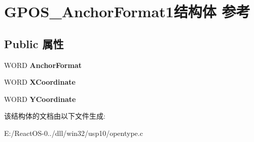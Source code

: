 \hypertarget{struct_g_p_o_s___anchor_format1}{}\section{G\+P\+O\+S\+\_\+\+Anchor\+Format1结构体 参考}
\label{struct_g_p_o_s___anchor_format1}
\subsection*{Public 属性}
\begin{DoxyCompactItemize}
\item 
\mbox{\label{struct_g_p_o_s___anchor_format1_ac1976368383d36f6607170c04d0459bd}} 
W\+O\+RD {\bfseries Anchor\+Format}
\item 
\mbox{\label{struct_g_p_o_s___anchor_format1_ae1111a20f68eb3f599e2305dcac01cee}} 
W\+O\+RD {\bfseries X\+Coordinate}
\item 
\mbox{\label{struct_g_p_o_s___anchor_format1_a8b70faf5c2f4f84990eb78e1bcbd1456}} 
W\+O\+RD {\bfseries Y\+Coordinate}
\end{DoxyCompactItemize}


该结构体的文档由以下文件生成\+:\begin{DoxyCompactItemize}
\item 
E\+:/\+React\+O\+S-\/0../dll/win32/usp10/opentype.\+c\end{DoxyCompactItemize}
